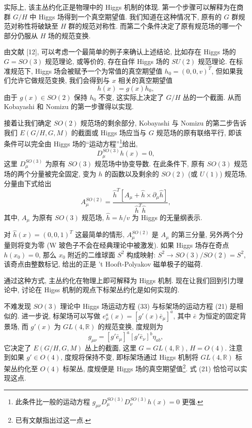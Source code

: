 \documentclass{article}
\begin{document}
实际上, 该主丛约化正是物理中的 Higgs 机制的体现. 第一个步骤可以解释为在商群 $G/H$ 中 Higgs 场得到一个真空期望值. 我们知道在这种情况下, 原有的 $G$ 群规范对称性将破缺至 $H$ 群的规范对称性. 而第二个条件决定了原有规范场的哪一个部分仍服从 $H$ 场的规范变换.

由文献 [12], 可以考虑一个最简单的例子来确认上述结论, 比如存在 Higgs 场的 $G=SO(3)$ 规范理论, 或等价的, 存在自伴 Higgs 场的 $SU(2)$ 规范理论. 在标准规范下, Higgs 场会被赋予一个为常值的真空期望值 $h_{0}=(0,0,v)^{T}$, 但如果我们允许它做规范变换, 我们会得到与 $x$ 相关的真空期望值
\begin{equation}
h(x)=g(x)h_{0},
\end{equation}
由于 $g(x)\in SO(2)$ 保持 $h_{0}$ 不变, 这实际上决定了 $G/H$ 丛的一个截面. 从而 Kobayashi 和 Nomizu 的第一步骤得以实现.

接着让我们确定 $SO(2)$ 规范场的剩余部分, Kobayashi 与 Nomizu 的第二步告诉我们  $E(G/H,G,M)$ 的截面或 Higgs 场应当与 $G$ 规范场的原有联络平行, 即该条件可以完全由 Higgs 场的``运动方程''\footnote{此条件比一般的运动方程 $g_{\mu\nu}D_{\mu}^{SO(3)}D_{\nu}^{SO(3)}h(x)=0$ 更强.}给出,
\begin{equation}
D_{\mu}^{SO(3)}h(x)=0,
\end{equation}
这里 $D_{\mu}^{SO(3)}$ 为原有 $SO(3)$ 规范场中协变导数. 在此条件下, 原有 $SO(3)$ 规范场的两个分量被完全固定, 变为 $h$ 的函数以及剩余的 $SO(2)$ (或 $U(1)$) 规范场, 分量由下式给出
\begin{equation}
A_{\mu}^{SO(2)}=\frac{\hat{h}^{T}\left[A_{\mu}+\hat{h}\times \partial_{\mu}\hat{h}\right]}{\hat{h}^{T}\hat{h}},
\end{equation}
其中, $A_{\mu}$ 为原有 $SO(3)$ 规范场, $\hat{h}=h/v$ 为 Higgs 的无量纲表示.

对 $\hat{h}(x)=(0,0,1)^{T}$ 这最简单的情形, $A_{\mu}^{SO(2)}$ 是 $A_{\mu}$ 的第三分量, 另外两个分量则将变为零 (W 玻色子不会在经典理论中被激发). 如果 Higgs 场存在奇点 $h(x_{0})=0$, 那么 $x_{0}$ 附近的二维球面 $S^{2}$ 构成映射: $S^{2}\rightarrow SO(3)/SO(2)=S^{2}$, 该奇点由整数标记, 给出的正是 't Hooft-Polyakov 磁单极子的磁荷.

通过这种方式, 主丛约化在物理上即可解释为 Higgs 机制. 现在让我们回到引力理论中, 讨论在 Higss 机制的观点下标架丛约化是如何实现的.

不难发现 $SO(3)$ 理论中 Higgs 场运动方程 (33) 与标架场的运动方程 (21) 是相似的. 进一步说, 标架场可以写做 $e_{\mu}^{a}(x)=[g'(x)\bar{e}_{\mu}]^{a}$, 其中 $\bar{e}$ 为恒定的固定背景场, 而 $g'(x)$ 为 $GL(4,\mathbb{R})$ 的规范变换, 度规则为
\begin{equation}
g_{\mu\nu}=[g'\bar{e}_{\mu}]^{a}[g'\bar{e}_{\nu}]^{b}\eta_{ab},
\end{equation}
它决定了 $E(G/H,G,M)$ 丛上的截面, 这里 $G=GL(4, \mathbb{R})$, $H=O(4)$. 注意到如果  $g'\in O(4)$, 度规将保持不变, 即标架场通过 Higgs 机制将 $GL(4, \mathbb{R})$ 标架丛约化至 $O(4)$ 标架丛, 度规便是 Higgs 场的真空期望值\footnote{已有文献指出过这一点.}. 式 (21) 恰恰可以实现这点.
\end{document}

